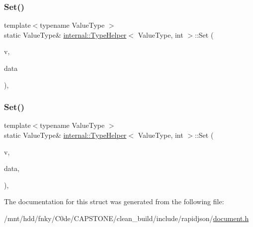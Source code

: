 \mbox{\label{structinternal_1_1TypeHelper_3_01ValueType_00_01int_01_4_aceea0a0fac6684e53a9d9f66da4154cd}} 
\subsubsection{\texorpdfstring{Set()}{Set()}\hspace{0.1cm}{\footnotesize\ttfamily [1/2]}}
{\footnotesize\ttfamily template$<$typename Value\+Type $>$ \\
static Value\+Type\& \hyperlink{structinternal_1_1TypeHelper}{internal\+::\+Type\+Helper}$<$ Value\+Type, int $>$\+::Set (\begin{DoxyParamCaption}\item[{Value\+Type \&}]{v,  }\item[{int}]{data }\end{DoxyParamCaption})\hspace{0.3cm}{\ttfamily [inline]}, {\ttfamily [static]}}

\mbox{\label{structinternal_1_1TypeHelper_3_01ValueType_00_01int_01_4_a2ca21bedcaeaf0fffe913edb2fe1a66a}} 
\subsubsection{\texorpdfstring{Set()}{Set()}\hspace{0.1cm}{\footnotesize\ttfamily [2/2]}}
{\footnotesize\ttfamily template$<$typename Value\+Type $>$ \\
static Value\+Type\& \hyperlink{structinternal_1_1TypeHelper}{internal\+::\+Type\+Helper}$<$ Value\+Type, int $>$\+::Set (\begin{DoxyParamCaption}\item[{Value\+Type \&}]{v,  }\item[{int}]{data,  }\item[{typename Value\+Type\+::\+Allocator\+Type \&}]{ }\end{DoxyParamCaption})\hspace{0.3cm}{\ttfamily [inline]}, {\ttfamily [static]}}



The documentation for this struct was generated from the following file\+:\begin{DoxyCompactItemize}
\item 
/mnt/hdd/fnky/\+C0de/\+C\+A\+P\+S\+T\+O\+N\+E/clean\+\_\+build/include/rapidjson/\hyperlink{document_8h}{document.\+h}\end{DoxyCompactItemize}
